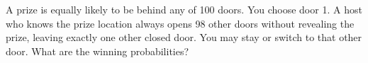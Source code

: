 A prize is equally likely to be behind any of 100 doors. You choose door 1. A host who knows the prize location always opens 98 other doors without revealing the prize, leaving exactly one other closed door. You may stay or switch to that other door. What are the winning probabilities?
